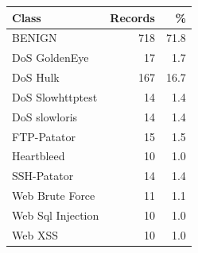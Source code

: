 \begin{tabular}{lrr}
\toprule
Class & Records & \% \\
\midrule
BENIGN & 718 & 71.8 \\
DoS GoldenEye & 17 & 1.7 \\
DoS Hulk & 167 & 16.7 \\
DoS Slowhttptest & 14 & 1.4 \\
DoS slowloris & 14 & 1.4 \\
FTP-Patator & 15 & 1.5 \\
Heartbleed & 10 & 1.0 \\
SSH-Patator & 14 & 1.4 \\
Web Brute Force & 11 & 1.1 \\
Web Sql Injection & 10 & 1.0 \\
Web XSS & 10 & 1.0 \\
\bottomrule
\end{tabular}
